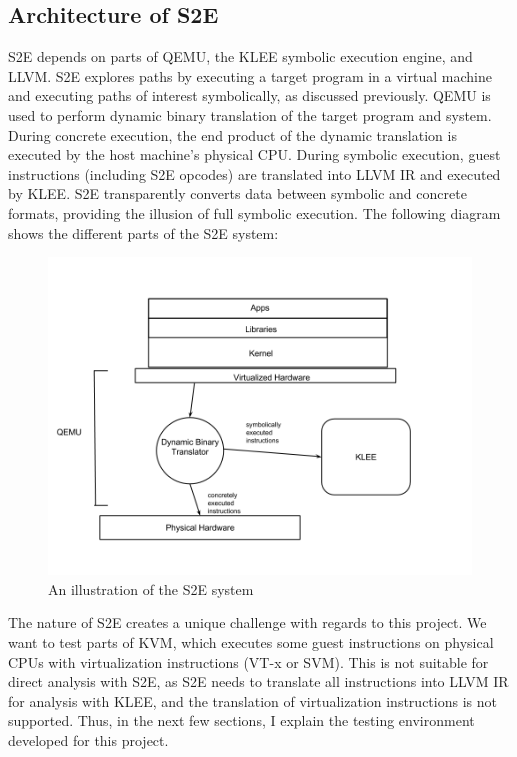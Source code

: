 \documentclass[11pt]{article}
\begin{document}
\subsection{Architecture of S2E}
S2E depends on parts of QEMU, the KLEE symbolic execution engine, and LLVM. S2E
explores paths by executing a target program in a virtual machine and executing
paths of interest symbolically, as discussed previously. QEMU is used to perform
dynamic binary translation of the target program and system. During concrete
execution, the end product of the dynamic translation is executed by the host
machine's physical CPU. During symbolic execution, guest instructions (including
S2E opcodes) are translated into LLVM IR and executed by KLEE. S2E transparently
converts data between symbolic and concrete formats, providing the illusion of
full symbolic execution. The following diagram shows the different parts of the
S2E system:
\begin{figure}[htp]
\centering
    \includegraphics[scale=.3]{s2e_arch}
\caption{An illustration of the S2E system}
\end{figure}
\newpage
The nature of S2E creates a unique challenge with regards to this project. We
want to test parts of KVM, which executes some guest instructions on physical
CPUs with virtualization instructions (VT-x or SVM). This is not suitable for
direct analysis with S2E, as S2E needs to translate all instructions into LLVM IR
for analysis with KLEE, and the translation of virtualization instructions is
not supported. Thus, in the next few 
sections, I explain the testing environment developed for this project. 
\end{document}
